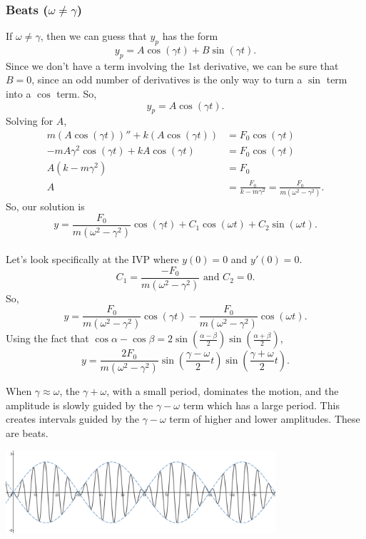 \subsubsection{Beats ($\omega \neq \gamma$)}
\noindent
If $\omega \neq \gamma$, then we can guess that $y_p$ has the form
\begin{equation*}
	y_p = A\cos{(\gamma t)} + B\sin{(\gamma t)}.
\end{equation*}
Since we don't have a term involving the 1st derivative, we can be sure that $B = 0$, since an odd number of derivatives is the only way to turn a $\sin$ term into a $\cos$ term.
So,
\begin{equation*}
	y_p = A\cos{(\gamma t)}.
\end{equation*}
Solving for $A$,
\begin{align*}
	m\left(A\cos{(\gamma t)}\right)'' + k\left(A\cos{(\gamma t)}\right) &= F_0\cos{(\gamma t)} \\
	-mA\gamma^2\cos{(\gamma t)} + kA\cos{(\gamma t)} &= F_0\cos{(\gamma t)} \\
	A\left(k - m\gamma^2\right) &= F_0 \\
	A &= \frac{F_0}{k - m\gamma^2} = \frac{F_0}{m(\omega^2 - \gamma^2)}.
\end{align*}
So, our solution is
\begin{equation*}
	y = \frac{F_0}{m(\omega^2 - \gamma^2)}\cos{(\gamma t)} + C_1\cos{(\omega t)} + C_2\sin{(\omega t)}.
\end{equation*}\\

\noindent
Let's look specifically at the IVP where $y(0) = 0$ and $y'(0) = 0$.
\begin{equation*}
	C_1 = \frac{-F_0}{m(\omega^2 - \gamma^2)} \text{ and } C_2 = 0.
\end{equation*}
So,
\begin{equation*}
	y = \frac{F_0}{m(\omega^2 - \gamma^2)}\cos{(\gamma t)} - \frac{F_0}{m(\omega^2 - \gamma^2)}\cos{(\omega t)}.
\end{equation*}
Using the fact that $\cos{\alpha}-\cos{\beta} = 2\sin{\left(\frac{\alpha - \beta}{2}\right)}\sin{\left(\frac{\alpha + \beta}{2}\right)}$,
\begin{equation*}
	y = \frac{2F_0}{m(\omega^2 - \gamma^2)}\sin{\left(\frac{\gamma - \omega}{2}t\right)}\sin{\left(\frac{\gamma + \omega}{2}t\right)}.
\end{equation*}

\noindent
When $\gamma \approx \omega$, the $\gamma + \omega$, with a small period, dominates the motion, and the amplitude is slowly guided by the $\gamma - \omega$ term which has a large period.
This creates intervals guided by the $\gamma - \omega$ term of higher and lower amplitudes.
These are beats.

\begin{center}
	\includegraphics[width=0.75\textwidth]{./higherOrder/forcedVibrs/beats.png}
\end{center}